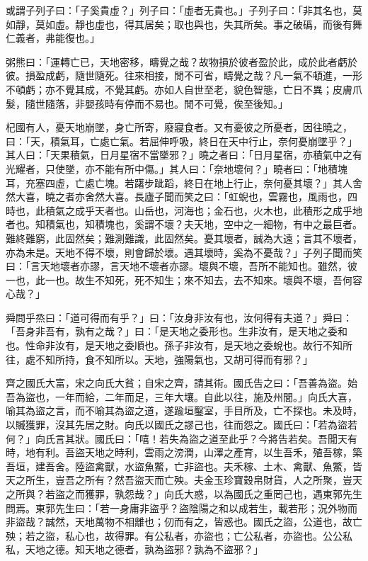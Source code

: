 \begin{pinyinscope}
或謂子列子曰：「子奚貴虛？」列子曰：「虛者无貴也。」子列子曰：「非其名也，莫如靜，莫如虛。靜也虛也，得其居矣；取也與也，失其所矣。事之破䃣，而後有舞仁義者，弗能復也。」

粥熊曰：「運轉亡已，天地密移，疇覺之哉？故物損於彼者盈於此，成於此者虧於彼。損盈成虧，隨世隨死。往來相接，閒不可省，疇覺之哉？凡一氣不頓進，一形不頓虧；亦不覺其成，不覺其虧。亦如人自世至老，貌色智態，亡日不異；皮膚爪髮，隨世隨落，非嬰孩時有停而不易也。閒不可覺，俟至後知。」

杞國有人，憂天地崩墜，身亡所寄，廢寢食者。又有憂彼之所憂者，因往曉之，曰：「天，積氣耳，亡處亡氣。若屈伸呼吸，終日在天中行止，奈何憂崩墜乎？」其人曰：「天果積氣，日月星宿不當墜邪？」曉之者曰：「日月星宿，亦積氣中之有光耀者，只使墜，亦不能有所中傷。」其人曰：「奈地壞何？」曉者曰：「地積塊耳，充塞四虛，亡處亡塊。若躇步跐蹈，終日在地上行止，奈何憂其壞？」其人舍然大喜，曉之者亦舍然大喜。長廬子聞而笑之曰：「虹蜺也，雲霧也，風雨也，四時也，此積氣之成乎天者也。山岳也，河海也；金石也，火木也，此積形之成乎地者也。知積氣也，知積塊也，奚謂不壞？夫天地，空中之一細物，有中之最巨者。難終難窮，此固然矣；難測難識，此固然矣。憂其壞者，誠為大遠；言其不壞者，亦為未是。天地不得不壞，則會歸於壞。遇其壞時，奚為不憂哉？」子列子聞而笑曰：「言天地壞者亦謬，言天地不壞者亦謬。壞與不壞，吾所不能知也。雖然，彼一也，此一也。故生不知死，死不知生；來不知去，去不知來。壞與不壞，吾何容心哉？」

舜問乎烝曰：「道可得而有乎？」曰：「汝身非汝有也，汝何得有夫道？」舜曰：「吾身非吾有，孰有之哉？」曰：「是天地之委形也。生非汝有，是天地之委和也。性命非汝有，是天地之委順也。孫子非汝有，是天地之委蛻也。故行不知所往，處不知所持，食不知所以。天地，強陽氣也，又胡可得而有邪？」

齊之國氏大富，宋之向氏大貧；自宋之齊，請其術。國氏告之曰：「吾善為盜。始吾為盜也，一年而給，二年而足，三年大壤。自此以往，施及州閭。」向氏大喜，喻其為盜之言，而不喻其為盜之道，遂踰垣鑿室，手目所及，亡不探也。未及時，以贓獲罪，沒其先居之財。向氏以國氏之謬己也，往而怨之。國氏曰：「若為盜若何？」向氏言其狀。國氏曰：「嘻！若失為盜之道至此乎？今將告若矣。吾聞天有時，地有利。吾盜天地之時利，雲雨之滂潤，山澤之產育，以生吾禾，殖吾稼，築吾垣，建吾舍。陸盜禽獸，水盜魚鱉，亡非盜也。夫禾稼、土木、禽獸、魚鱉，皆天之所生，豈吾之所有？然吾盜天而亡殃。夫金玉珍寶穀帛財貨，人之所聚，豈天之所與？若盜之而獲罪，孰怨哉？」向氏大惑，以為國氏之重罔己也，遇東郭先生問焉。東郭先生曰：「若一身庸非盜乎？盜陰陽之和以成若生，載若形；況外物而非盜哉？誠然，天地萬物不相離也；仞而有之，皆惑也。國氏之盜，公道也，故亡殃；若之盜，私心也，故得罪。有公私者，亦盜也；亡公私者，亦盜也。公公私私，天地之德。知天地之德者，孰為盜邪？孰為不盜邪？」


\end{pinyinscope}